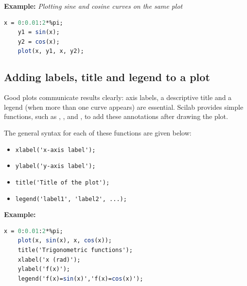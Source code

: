 		\textbf{Example:} \textit{Plotting sine and cosine curves on the same plot}
		\begin{lstlisting}[language=Scilab]
	x = 0:0.01:2*%pi;
	y1 = sin(x);
	y2 = cos(x);
	plot(x, y1, x, y2);
		\end{lstlisting}
	
	\subsection{Adding labels, title and legend to a plot}
		Good plots communicate results clearly: axis labels, a descriptive title and a legend (when more than one curve appears) are essential. Scilab provides simple functions, such as , ,  and , to add these annotations after drawing the plot.
		
		The general syntax for each of these functions are given below:
		\begin{itemize}
			\item \verb|xlabel('x-axis label');|
			\item \verb|ylabel('y-axis label');|
			\item \verb|title('Title of the plot');|
			\item \verb|legend('label1', 'label2', ...);|
		\end{itemize}

		\textbf{Example:}
		\begin{lstlisting}[language=Scilab]
	x = 0:0.01:2*%pi;
	plot(x, sin(x), x, cos(x));
	title('Trigonometric functions');
	xlabel('x (rad)');
	ylabel('f(x)');
	legend('f(x)=sin(x)','f(x)=cos(x)');
		\end{lstlisting}